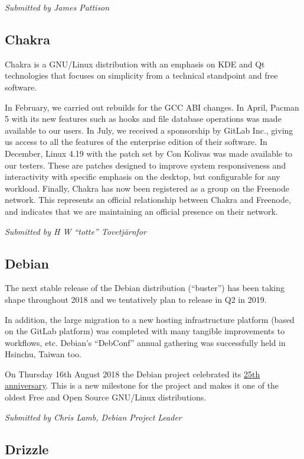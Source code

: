 \documentclass[a4paper]{report}
\begin{document}
{\em Submitted by James Pattison}

\subsection{Chakra}

Chakra is a GNU/Linux distribution with an emphasis on KDE and Qt
technologies that focuses on simplicity from a technical standpoint and
free software.

In February, we carried out rebuilds for the GCC ABI changes. In April,
Pacman 5 with its new features such as hooks and file database
operations was made available to our users. In July, we received a
sponsorship by GitLab Inc., giving us access to all the features of the
enterprise edition of their software. In December, Linux 4.19 with the
patch set by Con Kolivas was made available to our testers. These are
patches designed to improve system responsiveness and interactivity with
specific emphasis on the desktop, but configurable for any workload.
Finally, Chakra has now been registered as a group on the Freenode
network. This represents an official relationship between Chakra and
Freenode, and indicates that we are maintaining an official presence on
their network.

{\em Submitted by H W ``totte'' Tovetjärnfor}

\subsection{Debian}

The next stable release of the Debian distribution (``buster'') has been
taking shape throughout 2018 and we tentatively plan to release in Q2 in
2019.

In addition, the large migration to a new hosting infrastructure
platform (based on the GitLab platform) was completed with many tangible
improvements to workflows, etc.  Debian's ``DebConf'' annual gathering
was successfully held in Hsinchu, Taiwan too.

On Thursday 16th August 2018 the Debian project celebrated its
\href{https://bits.debian.org/2018/08/debian-is-25.html}{25th
anniversary}.  This is a new milestone for the project and makes it one
of the oldest Free and Open Source GNU/Linux distributions.

{\em Submitted by Chris Lamb, Debian Project Leader}

\subsection{Drizzle}
\end{document}
